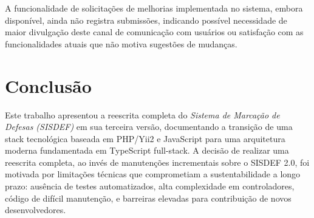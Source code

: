 \documentclass[nonacm, sigconf]{acmart}
\begin{document}
A funcionalidade de solicitações de melhorias implementada no sistema, embora disponível, ainda não registra submissões, indicando possível necessidade de maior divulgação deste canal de comunicação com usuários ou satisfação com as funcionalidades atuais que não motiva sugestões de mudanças.






\section{Conclusão}

Este trabalho apresentou a reescrita completa do \textit{Sistema de Marcação de Defesas (SISDEF)} em sua terceira versão, documentando a transição de uma stack tecnológica baseada em PHP/Yii2 e JavaScript para uma arquitetura moderna fundamentada em TypeScript full-stack. A decisão de realizar uma reescrita completa, ao invés de manutenções incrementais sobre o SISDEF 2.0, foi motivada por limitações técnicas que comprometiam a sustentabilidade a longo prazo: ausência de testes automatizados, alta complexidade em controladores, código de difícil manutenção, e barreiras elevadas para contribuição de novos desenvolvedores.
\end{document}
